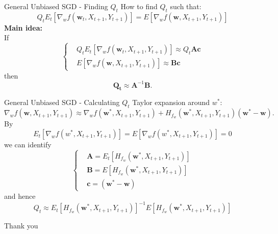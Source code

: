 \documentclass{beamer}
\begin{document}
\begin{frame}{General Unbiased SGD - Finding $Q_t$}
How to find $Q_t$ such that:
\begin{equation*}
    Q_tE_t[\nabla_wf(\bm{w}_{t},X_{t+1},Y_{t+1})] = E[\nabla_wf(\bm{w},X_{t+1},Y_{t+1})]
\end{equation*}
    \textbf{Main idea:}\\
    If
    \begin{equation*}
    \begin{cases}
&Q_tE_t[\nabla_wf(\bm{w}_{t},X_{t+1},Y_{t+1})] \approx Q_t\bm{A}\bm{c} \\
&E[\nabla_wf(\bm{w},X_{t+1},Y_{t+1})] \approx \bm{B}\bm{c}
    \end{cases}
\end{equation*}
then 
\begin{equation*}
    \bm{Q_t} \approx \bm{A}^{-1}\bm{B}.
\end{equation*} 
\end{frame}

\begin{frame}{General Unbiased SGD - Calculating $Q_t$}
    Taylor expansion around $w^*$:
    \begin{equation*}
    \nabla_w f(\bm{w},X_{t+1},Y_{t+1}) \approx \nabla_w f(\bm{w}^*,X_{t+1},Y_{t+1}) + H_{f_w}(\bm{w}^*,X_{t+1},Y_{t+1}) (\bm{w}^*-\bm{w}).
\end{equation*}
By
\begin{equation*}
    E_t[\nabla_w f(w^*,X_{t+1},Y_{t+1})]=E[\nabla_w f(w^*,X_{t+1},Y_{t+1})]=0
\end{equation*}
we can identify
\begin{equation*}
    \begin{cases}
        &\bm{A} = E_t[H_{f_w}(\bm{w}^*,X_{t+1},Y_{t+1})] \\
        &\bm{B} = E[H_{f_w}(\bm{w}^*,X_{t+1},Y_{t+1})]  \\
        &\bm{c} = (\bm{w}^*-\bm{w})
    \end{cases}
\end{equation*}
and hence
\begin{equation*}
    Q_t \approx E_t[H_{f_w}(\bm{w}^*,X_{t+1},Y_{t+1})]^{-1}E[H_{f_w}(\bm{w}^*,X_{t+1},Y_{t+1})]
\end{equation*}
\end{frame}


\begin{frame}
\Huge{\centerline{Thank you}}
\end{frame}
\end{document}
